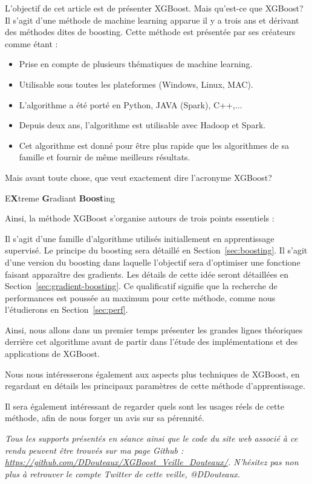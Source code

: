 L'objectif de cet article est de présenter XGBoost. Mais qu'est-ce que XGBoost? Il s'agit d'une méthode de machine learning apparue il y a trois ans et dérivant des méthodes dites de boosting. Cette méthode est présentée par ses créateurs comme étant :
\begin{itemize}
	\item[\thColor{\faFlag~~Flexible}]Prise en compte de plusieurs thématiques de machine learning.
	\item[\thColor{\faCube~~Portable}]Utilisable sous toutes les plateformes (Windows, Linux, MAC).
	\item[\thColor{\faCommentsO~~Multi-langages}]L'algorithme a été porté en Python, JAVA (Spark), C++,...
	\item[\thColor{\faCloud~~Distribuée}]Depuis deux ans, l'algorithme est utilisable avec Hadoop et Spark.
	\item[\thColor{\faRocket~~Perfomante}]Cet algorithme est donné pour être plus rapide que les algorithmes de sa famille et fournir de même meilleurs résultats.
\end{itemize}
Mais avant toute chose, que veut exactement dire l'acronyme \og XGBoost\fg?
\begin{center}
E\textbf{\textcolor{bluenight}{X}}treme \textbf{\textcolor{bluenight}{G}}radiant \textbf{\textcolor{bluenight}{Boost}}ing
\end{center}
Ainsi, la méthode XGBoost s'organise autours de trois points essentiels :
\begin{itemize}
	Il s'agit d'une famille d'algorithme utilisés initiallement en apprentissage supervisé. Le principe du boosting sera détaillé en Section~\ref{sec:boosting}.
	Il s'agit d'une version du boosting dans laquelle l'objectif sera d'optimiser une fonctione faisant apparaître des gradients. Les détails de cette idée seront détaillées en Section~\ref{sec:gradient-boosting}.
	Ce qualificatif signifie que la recherche de performances est poussée au maximum pour cette méthode, comme nous l'étudierons en Section~\ref{sec:perf}.
\end{itemize}
Ainsi, nous allons dans un premier temps présenter les grandes lignes théoriques derrière cet algorithme avant de partir dans l'étude des implémentations et des applications de XGBoost.

Nous nous intéresserons également aux aspects plus techniques de XGBoost, en regardant en détails les principaux paramètres de cette méthode d'apprentissage.

Il sera également intéressant de regarder quels sont les usages réels de cette méthode, afin de nous forger un avis sur sa pérennité.

\vskip 1cm
\textit{Tous les supports présentés en séance ainsi que le code du site web associé à ce rendu peuvent être trouvés sur ma page Github : \url{https://github.com/DDouteaux/XGBoost_Veille_Douteaux/}. N'hésitez pas non plus à retrouver le compte Twitter de cette veille, @DDouteaux.}
